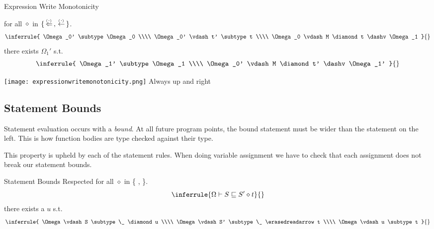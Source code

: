 \documentclass[12pt,twoside]{report}
\begin{document}
\begin{Property}{Expression Write Monotonicity}{} %
  \begin{minipage}{0.6\textwidth}
    \centering
    for all $\diamond$ in $\{  \,\stackrel{_(._)}{\Leftarrow}\,, \,\stackrel{_(._)}{\leftarrow}\,  \}$.
    \[\inferrule{
      \Omega_0' \subtype \Omega_0 \\\\
      \Omega_0' \vdash t' \subtype t \\\\
      \Omega_0 \vdash M \diamond t \dashv \Omega_1
    }{}\]
    there exists $\Omega_1'$ s.t.
    \[\inferrule{
      \Omega_1' \subtype \Omega_1 \\\\
      \Omega_0' \vdash M \diamond t' \dashv \Omega_1' 
    }{}\]
  \end{minipage}
  \begin{minipage}{0.3\textwidth}
    \centering
    \texttt{[image: expressionwritemonotonicity.png]}
    Always up and right
  \end{minipage}
  \label{property:expressionwritemonotonicity}
\end{Property}

\subsection{Statement Bounds}
Statement evaluation occurs with a \textit{bound}. At all future program points, the bound statement must be wider than the statement on the left. This is how function bodies are type checked against their type.

This property is upheld by each of the statement rules. When doing variable assignment  we have to check that each assignment does not break our statement bounds.

\begin{Property}{Statement Bounds Respected}{} %
    \centering
    for all $\diamond$ in \{ \readarrowabs, \movearrowabs \}.
    \[\inferrule{
      \Omega \vdash S \subtype S' \diamond t
    }{}\]
    there exists a $u$ s.t.
    \[\inferrule{
      \Omega \vdash S \subtype \_ \diamond u \\\\
      \Omega \vdash S' \subtype \_ \erasedreadarrow t \\\\
      \Omega \vdash u \subtype t
    }{}\]
\end{Property}
\label{theorem:statementbounds}
\end{document}
